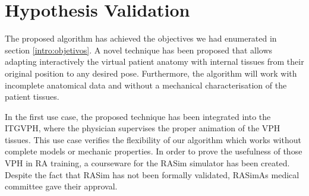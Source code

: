 \section{Hypothesis Validation}
\label{conclu:hipotesis}

The proposed algorithm has achieved the objectives we had enumerated in section \ref{intro:objetivos}. A novel technique has been proposed that allows adapting interactively the virtual patient anatomy with internal tissues from their original position to any desired pose. Furthermore, the algorithm will work with incomplete anatomical data and without a mechanical characterisation of the patient tissues. %

In the first use case, the proposed technique has been integrated into the ITGVPH, where the physician supervises the proper animation of the VPH tissues. This use case verifies the flexibility of our algorithm which works without complete models or mechanic properties. In order to prove the usefulness of those VPH in RA training, a courseware for the RASim simulator has been created. Despite the fact that \acs{RASim} has not been formally validated, \acs{RASimAs} medical committee gave their approval. 







